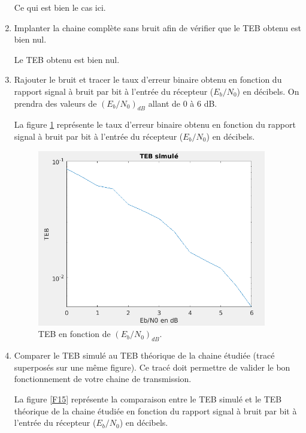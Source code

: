 \documentclass[frenchb]{article}
\begin{document}
\begin{enumerate}
	Ce qui est bien le cas ici. 
    \item Implanter la chaine complète sans bruit afin de vérifier que le TEB obtenu est bien nul.
    \par\leavevmode\par
    \setlength\parindent{0.5cm}
    Le TEB obtenu est bien nul.
    
    \item Rajouter le bruit et tracer le taux d'erreur binaire obtenu en fonction du rapport signal à bruit par bit à l'entrée du récepteur ($E_b/N_0$) en décibels. On prendra des valeurs de $\left(E_b/N_0\right)_{dB}$ allant de $0$ à $6$ dB.
    \par\leavevmode\par
    \setlength\parindent{0.5cm}
    La figure \ref{F14} représente le taux d'erreur binaire obtenu en fonction du rapport signal à bruit par bit à l'entrée du récepteur ($E_b/N_0$) en décibels.
    \begin{figure}[ht!]
    		\centering
		\includegraphics[width=10cm]{C1tebs.png}		              	 	\caption{TEB en fonction de $\left(E_b/N_0\right)_{dB}$. \label{F14}}
	\end{figure}
    \newpage
    \item Comparer le TEB simulé au TEB théorique de la chaine étudiée (tracé superposés sur une même figure). Ce tracé doit permettre de valider le bon fonctionnement de votre chaine de transmission.
     \par\leavevmode\par
    \setlength\parindent{0.5cm}
    La figure \ref{F15} représente la comparaison entre le TEB simulé et le TEB théorique de la chaine étudiée en fonction du rapport signal à bruit par bit à l'entrée du récepteur ($E_b/N_0$) en décibels.
    \begin{figure}[ht!]

\end{figure}
\end{enumerate}
\end{document}
